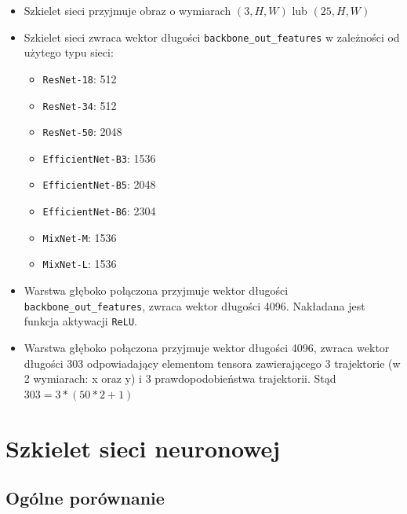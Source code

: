 \begin{itemize}
    \setlength{\itemsep}{1pt}
    \setlength{\parskip}{0pt}
    \setlength{\parsep}{0pt}
    \item Szkielet sieci przyjmuje obraz o wymiarach $(3, H, W)$ lub $(25, H, W)$
    \item Szkielet sieci zwraca wektor długości \texttt{backbone\_out\_features} w zależności od użytego typu sieci:
        \begin{itemize}
            \setlength{\itemsep}{1pt}
            \setlength{\parskip}{0pt}
            \setlength{\parsep}{0pt}
            \item \texttt{ResNet-18}: 512
            \item \texttt{ResNet-34}: 512
            \item \texttt{ResNet-50}: 2048
            \item \texttt{EfficientNet-B3}: 1536
            \item \texttt{EfficientNet-B5}: 2048
            \item \texttt{EfficientNet-B6}: 2304
            \item \texttt{MixNet-M}: 1536
            \item \texttt{MixNet-L}: 1536
        \end{itemize}
    \item Warstwa głęboko połączona przyjmuje wektor długości \texttt{backbone\_out\_features}, zwraca wektor długości 4096. Nakładana jest funkcja aktywacji \texttt{ReLU}.
    \item Warstwa głęboko połączona przyjmuje wektor długości 4096, zwraca wektor długości 303 odpowiadający elementom tensora zawierającego 3 trajektorie (w 2 wymiarach: x oraz y) i 3 prawdopodobieństwa trajektorii. Stąd $303 = 3*(50 * 2 + 1)$
\end{itemize}

\section{Szkielet sieci neuronowej}

\subsection{Ogólne porównanie}

